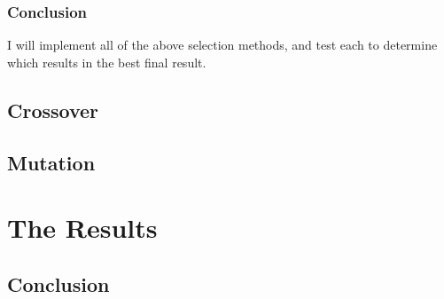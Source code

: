 \documentclass[]{report}
\begin{document}

\subsection{Conclusion}

I will implement all of the above selection methods, and test each to determine which results in the best final result.

\section{Crossover}

\section{Mutation}

\chapter{The Results}

\section{Conclusion}


\end{document}
